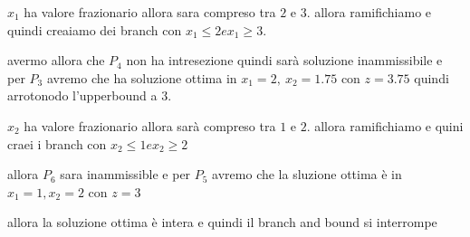 $x_1$ ha valore frazionario allora sara compreso tra $2$ e $3$. allora ramifichiamo e quindi creaiamo dei branch con $x_1 \leq 2 e x_1 \geq 3$.

avermo allora che $P_4$ non ha intresezione quindi sarà soluzione inammissibile e per $P_3$ avremo che ha soluzione ottima in $x_1 = 2,\ x_2 = 1.75$ con $z = 3.75$ quindi arrotonodo l'upperbound a $3$.

$x_2$ ha valore frazionario allora sarà compreso tra $1$ e $2$. allora ramifichiamo e quini craei i branch con $x_2 \leq 1 e x_2 \geq 2$

allora $P_6$ sara inammissible e per $P_5$ avremo che la sluzione ottima è in $x_1 = 1, x_2 = 2$ con $z = 3$

allora la soluzione ottima è intera e quindi il branch and bound si interrompe
